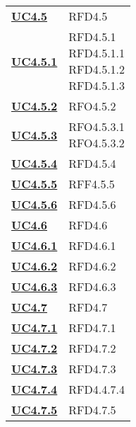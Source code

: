 \begin{longtable}[H]{| >{\centering\bfseries}p{8cm} | >{\centering\arraybackslash}p{8cm} |}
    \hyperref[ssub:uc4.5]{UC4.5} & RFD4.5 \\

    \hyperref[par:uc4.5.1]{UC4.5.1}  & \makecell{
        \rule{0pt}{4ex}
        RFD4.5.1 \\
        RFD4.5.1.1 \\
        RFD4.5.1.2 \\
        RFD4.5.1.3 \\
        \rule{0pt}{4ex}
        } \\

    \hyperref[par:uc4.5.2]{UC4.5.2} & RFO4.5.2\\

    \hyperref[par:uc4.5.3]{UC4.5.3} & \makecell{
        \rule{0pt}{4ex}
        RFO4.5.3.1 \\
        RFO4.5.3.2 \\
        \rule{0pt}{4ex}
        } \\

    \hyperref[par:uc4.5.4]{UC4.5.4} & RFD4.5.4 \\

    \hyperref[par:uc4.5.5]{UC4.5.5} & RFF4.5.5 \\

    \hyperref[par:uc4.5.6]{UC4.5.6} & RFD4.5.6 \\

    \hyperref[ssub:uc4.6]{UC4.6} & RFD4.6 \\

    \hyperref[par:uc4.6.1]{UC4.6.1} & RFD4.6.1 \\

    \hyperref[par:uc4.6.2]{UC4.6.2} & RFD4.6.2 \\

    \hyperref[par:uc4.6.3]{UC4.6.3} & RFD4.6.3 \\


    \hyperref[ssub:uc4.7]{UC4.7} & RFD4.7 \\

    \hyperref[par:uc4.7.1]{UC4.7.1} & RFD4.7.1 \\

    \hyperref[par:uc4.7.2]{UC4.7.2} & RFD4.7.2 \\

    \hyperref[par:uc4.7.3]{UC4.7.3} & RFD4.7.3 \\

    \hyperref[par:uc4.7.4]{UC4.7.4} & RFD4.4.7.4 \\

    \hyperref[par:uc4.7.5]{UC4.7.5} & RFD4.7.5 \\


\end{longtable}
